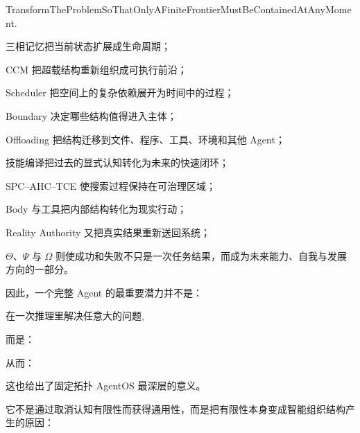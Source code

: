 \begin{statementbox}
TransformTheProblemSoThatOnlyAFiniteFrontierMustBeContainedAtAnyMoment.
\end{statementbox}

三相记忆把当前状态扩展成生命周期；

CCM 把超载结构重新组织成可执行前沿；

Scheduler 把空间上的复杂依赖展开为时间中的过程；

Boundary 决定哪些结构值得进入主体；

Offloading 把结构迁移到文件、程序、工具、环境和其他 Agent；

技能编译把过去的显式认知转化为未来的快速闭环；

SPC--AHC--TCE 使搜索过程保持在可治理区域；

Body 与工具把内部结构转化为现实行动；

Reality Authority 又把真实结果重新送回系统；

$\Theta$、$\Psi$ 与 $\Omega$ 则使成功和失败不只是一次任务结果，而成为未来能力、自我与发展方向的一部分。

因此，一个完整 Agent 的最重要潜力并不是：

\begin{statementbox}
在一次推理里解决任意大的问题,
\end{statementbox}
而是：

\begin{statementbox}
\centering
{}
\end{statementbox}

从而：

\begin{statementbox}
\centering
{}
\end{statementbox}

这也给出了固定拓扑 AgentOS 最深层的意义。

它不是通过取消认知有限性而获得通用性，而是把有限性本身变成智能组织结构产生的原因：

\begin{statementbox}
\centering
{}
\end{statementbox}


